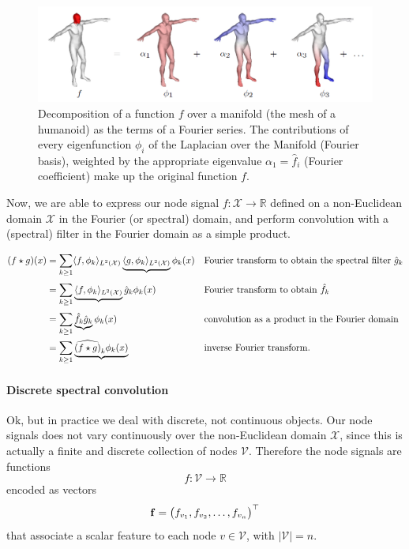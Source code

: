 \begin{figure}[H]
    \centering
    \includegraphics[width=.7\textwidth]{figures/12/fourier-basis-manifold.png}
    \caption{Decomposition of a function $f$ over a manifold (the mesh of a humanoid) as the terms of a Fourier series. The contributions of every eigenfunction $\phi_i$ of the Laplacian over the Manifold (Fourier basis), weighted by the appropriate eigenvalue $\alpha_1 = \hat{f}_i$ (Fourier coefficient) make up the original function $f$.}
\end{figure}

Now, we are able to express our node signal $f: \mathcal{X} \to \mathbb{R}$ defined on a non-Euclidean domain $\mathcal{X}$ in the Fourier (or spectral) domain, and perform convolution with a (spectral) filter in the Fourier domain as a simple product. 

\begin{align}
    (f \star g) (x) & = \sum_{k \geq 1} \langle f, \phi_k \rangle_{L^2(\mathcal{X})} \underbrace{\langle g, \phi_k \rangle_{L^2(\mathcal{X})}}_{} \phi_k (x) && \text{Fourier transform to obtain the spectral filter } \hat{g}_k \\
    & = \sum_{k \geq 1} \underbrace{\langle f, \phi_k \rangle_{L^2(\mathcal{X})}}_{} \hat{g}_k \phi_k (x) && \text{Fourier transform to obtain } \hat{f}_k \\
    & = \sum_{k \geq 1} \underbrace{\hat{f}_k \hat{g}_k}_{} \phi_k (x) && \text{convolution as a product in the Fourier domain} \\
    & = \sum_{k \geq 1} \underbrace{\widehat{(f \star g)}_k \phi_k (x)}_{} && \text{inverse Fourier transform}.
\end{align}

\paragraph{Discrete spectral convolution}
Ok, but in practice we deal with discrete, not continuous objects. Our node signals does not vary continuously over the non-Euclidean domain $\mathcal{X}$, since this is actually a finite and discrete collection of nodes $\mathcal{V}$. Therefore the node signals are functions 
\begin{equation}
    f: \mathcal{V} \to \mathbb{R}
\end{equation}
encoded as vectors 
\begin{equation}
    \vb{f} = \mqty(f_{v_1}, f_{v_2}, \dots, f_{v_n})^{\top}
\end{equation}
that associate a scalar feature to each node $v \in \mathcal{V}$, with $|\mathcal{V}| = n$. 
\\

